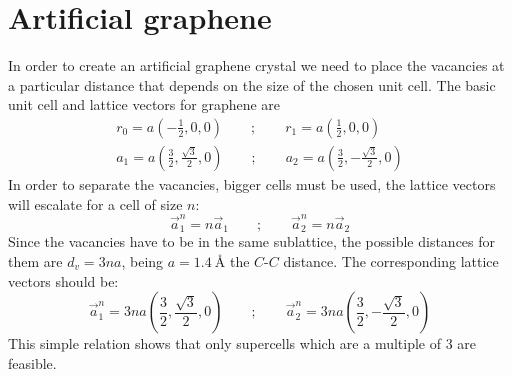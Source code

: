 \section{Artificial graphene}
In order to create an artificial graphene crystal we need to place the vacancies at a particular distance that depends on the size of the chosen unit cell.
The basic unit cell and lattice vectors for graphene are
\begin{equation}
\begin{split}
  r_0 = a\left(-\frac{1}{2},0,0\right) \qquad ; \qquad
  r_1 = a\left(\frac{1}{2},0,0\right)\\
  a_1 = a\left(\frac{3}{2},\frac{\sqrt{3}}{2},0\right) \qquad ; \qquad
  a_2 = a\left(\frac{3}{2},-\frac{\sqrt{3}}{2},0\right)
\end{split}
\end{equation}
In order to separate the vacancies, bigger cells must be used, the lattice vectors will escalate for a cell of size $n$:
\begin{equation}
  \vec{a}^n_1 = n \vec{a}_1 \qquad ; \qquad \vec{a}^n_2 = n \vec{a}_2
\end{equation}
Since the vacancies have to be in the same sublattice, the possible distances for them are $d_v = 3na$, being $a=\SI{1.4}{\angstrom}$ the $C$-$C$ distance. The corresponding lattice vectors should be:
\begin{equation}
  \vec{a}^n_1 = 3na\left(\frac{3}{2},\frac{\sqrt{3}}{2},0\right) \qquad ; \qquad
  \vec{a}^n_2 = 3na\left(\frac{3}{2},-\frac{\sqrt{3}}{2},0\right)
\end{equation}
This simple relation shows that only supercells which are a multiple of 3 are feasible.




